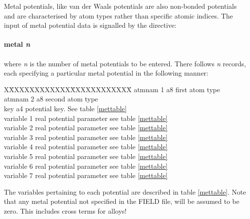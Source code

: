 Metal potentials, like van der Waals potentials are also non-bonded
potentials and are characterised by atom types rather than specific
atomic indices. The input of metal potential data is signalled by the
directive:

\paragraph*{metal {\em n}}
\paragraph*{}

\noindent
where {\em n} is the number of metal potentials to be entered. There
follows {\em n} records, each specifying a particular metal potential
in the following manner:

\begin{tabbing}
X\=XXXXXXXXXXXX\=XXXXXXXXXXXX\=\kill
\> atmnam 1 \> a8 \> first atom type\\
\> atmnam 2 \> a8 \> second atom type\\
\> key \> a4 \> potential key. See table \ref{mettable}\\
\> variable 1 \> real \> potential parameter see table
\ref{mettable}\\
\> variable 2 \> real \> potential parameter see table
\ref{mettable}\\
\> variable 3 \> real \> potential parameter see table
\ref{mettable}\\
\> variable 4 \> real \> potential parameter see table
\ref{mettable}\\
\> variable 5 \> real \> potential parameter see table
\ref{mettable}\\
\> variable 6 \> real \> potential parameter see table
\ref{mettable}\\
\> variable 7 \> real \> potential parameter see table
\ref{mettable}\\
\end{tabbing}

\noindent The variables pertaining to each potential are described in table
\ref{mettable}.
Note that any metal potential not specified in the FIELD file, will be
assumed to be zero. This includes cross terms for alloys!

